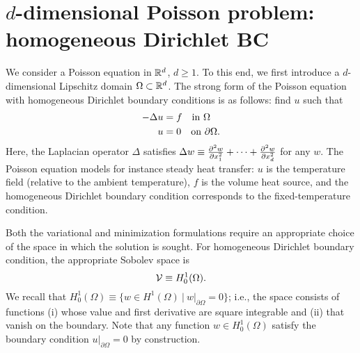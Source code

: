 \section{$d$-dimensional Poisson problem: homogeneous Dirichlet BC}
\label{sec:posnd_homo_dir}
We consider a Poisson equation in $\mathbb{R}^d$, $d \geq 1$.  To this end, we first introduce a $d$-dimensional Lipschitz domain $\Omega \subset \mathbb{R}^d$. The strong form of the Poisson equation with homogeneous Dirichlet boundary conditions is as follows: find $u$ such that
\begin{align}
  - \Delta u &= f \quad \text{in } \Omega \label{eq:posnd_strong} \\
  u &= 0 \quad \text{on } \partial \Omega \notag.
\end{align}
 Here, the Laplacian operator $\Delta$ satisfies $\Delta w \equiv \frac{\partial ^2w}{\partial x^2_1} + \cdots + \frac{\partial ^2w}{\partial x^2_d}$ for any $w$.  The Poisson equation models for instance steady heat transfer: $u$ is the temperature field (relative to the ambient temperature), $f$ is the volume heat source, and the homogeneous Dirichlet boundary condition corresponds to the fixed-temperature condition.

Both the variational and minimization formulations require an appropriate choice of the space in which the solution is sought.  For homogeneous Dirichlet boundary condition, the appropriate Sobolev space is
\begin{equation*}
  \mathcal{V} \equiv H^1_0(\Omega).
\end{equation*}
We recall that $H^1_0(\Omega) \equiv \{ w \in H^1(\Omega) \ | \ w|_{\partial \Omega} = 0 \}$; i.e., the space consists of functions (i) whose value and first derivative are square integrable and (ii) that vanish on the boundary.  Note that any function $w \in H^1_0(\Omega)$ satisfy the boundary condition $u|_{\partial \Omega} = 0$ by construction.

